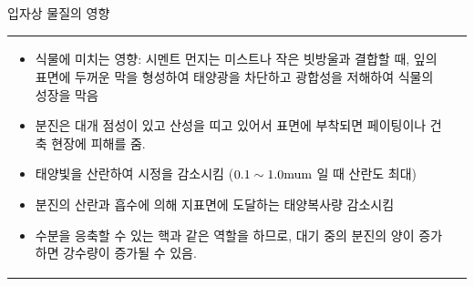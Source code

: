 \begin{frame}[t]{입자상 물질의 영향}
	\begin{tabular}{ll}
		\begin{minipage}[t]{0.475\textwidth}\scriptsize
			\begin{itemize}			
				\item 식물에 미치는 영향: 시멘트 먼지는 미스트나 작은 빗방울과 결합할 때, 잎의 표면에 두꺼운 막을 형성하여 태양광을 차단하고 광합성을 저해하여 식물의 성장을 막음							
				\item 분진은 대개 점성이 있고 산성을 띠고 있어서 표면에 부착되면 페이팅이나 건축 현장에 피해를 줌.
				\item 태양빛을 산란하여 시정을 감소시킴 ($0.1 \sim 1.0 \rm {mu m}$ 일 때 산란도 최대)
				\item 분진의 산란과 흡수에 의해 지표면에 도달하는 태양복사량 감소시킴
				\item 수분을 응축할 수 있는 핵과 같은 역할을 하므로, 대기 중의 분진의 양이 증가하면 강수량이 증가될 수 있음.
			\end{itemize}

		\end{minipage}	
		&
		\begin{minipage}[t]{0.475\textwidth} \scriptsize	
			
		\end{minipage}
	\end{tabular}
\end{frame}




